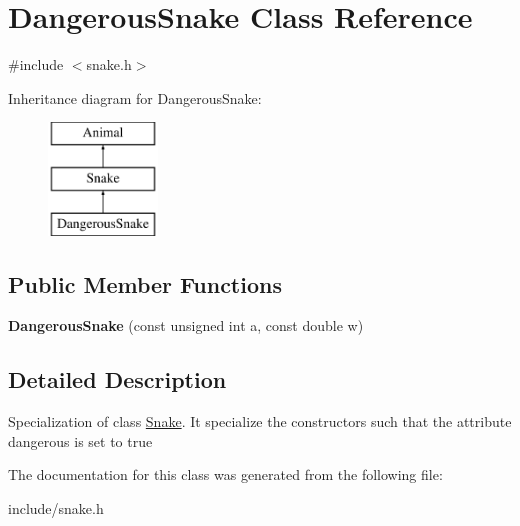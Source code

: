 \hypertarget{classDangerousSnake}{}\section{Dangerous\+Snake Class Reference}
\label{classDangerousSnake}


{\ttfamily \#include $<$snake.\+h$>$}

Inheritance diagram for Dangerous\+Snake\+:\begin{figure}[H]
\begin{center}
\leavevmode
\includegraphics[height=3.000000cm]{classDangerousSnake}
\end{center}
\end{figure}
\subsection*{Public Member Functions}
\begin{DoxyCompactItemize}
\item 
{\bfseries Dangerous\+Snake} (const unsigned int a, const double w)\hypertarget{classDangerousSnake_affea07d2d8e6bcb61ee192cca2a05838}{}\label{classDangerousSnake_affea07d2d8e6bcb61ee192cca2a05838}

\end{DoxyCompactItemize}


\subsection{Detailed Description}
Specialization of class \hyperlink{classSnake}{Snake}. It specialize the constructors such that the attribute {\ttfamily dangerous} is set to true 

The documentation for this class was generated from the following file\+:\begin{DoxyCompactItemize}
\item 
include/snake.\+h\end{DoxyCompactItemize}
